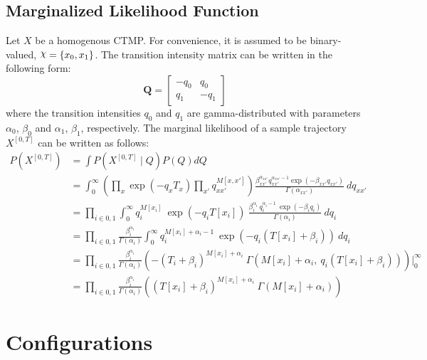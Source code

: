 \subsection{Marginalized Likelihood Function} 
Let $ X $ be a homogenous CTMP. For convenience, it is assumed to be binary-valued, $ \rchi = \left\lbrace x_{0}, x_{1} \right\rbrace $. The transition intensity matrix can be written in the following form:
\begin{equation}
\textbf{Q} = 
\begin{bmatrix}
-q_{0} & q_{0} \\
q_{1} & -q_{1}
\end{bmatrix}
\end{equation}
where the transition intensities $ q_{0} $ and $ q_{1} $ are gamma-distributed with parameters $ \alpha_{0}$, $ \beta_{0} $ and $ \alpha_{1} $, $ \beta_{1} $, respectively. The marginal likelihood of a sample trajectory $ X^{[0,T]} $ can be written as follows:
\begin{align}
P(X^{[0, T]}) & = \int  P(X^{[0, T]}\mid Q)P(Q) dQ \nonumber\\ & = \int_{0}^{\infty} \left( \prod_{x} \exp(-q_{x}T_{x}) \prod_{x'} q_{xx'}^{M[x, x']}\right) \frac{\beta_{xx'}^{\alpha_{xx'}}{q_{xx'}^{\alpha_{xx'}-1}}\exp(-\beta_{xx'}q_{xx'})}{\Gamma(\alpha_{xx'})} \ dq_{xx'} \nonumber\\ & = \prod_{i\in{0,1}}\int_{0}^{\infty} q_{i}^{M[x_{i}]} \ \exp(-q_{i}T[x_{i}]) \  \frac{\beta_{i}^{\alpha_{i}} \ q_{i}^{\alpha_{i}-1}\ \exp(-\beta_{i}q_{i})}{\Gamma(\alpha_{i})} \ dq_{i} \nonumber\\ & = \prod_{i\in{0,1}} \frac{\beta_{i}^{\alpha_{i}}}{\Gamma(\alpha_{i})} \int_{0}^{\infty} q_{i}^{M[x_{i}] + \alpha_{i} -1} \ \exp(-q_{i}(T[x_{i}]+\beta_{i})) \ dq_{i} \\ & = \prod_{i\in{0,1}} \frac{\beta_{i}^{\alpha_{i}}}{\Gamma(\alpha_{i})} \left( -(T_{i}+\beta_{i})^{M[x_{i}] + \alpha_{i}}\ \Gamma(M[x_{i}] + \alpha_{i}, \ q_{i}(T[x_{i}]+\beta_{i})) \right) \Big|_0^\infty  \\ & = \prod_{i\in{0,1}} \frac{\beta_{i}^{\alpha_{i}}}{\Gamma(\alpha_{i})} \left( (T[x_{i}]+\beta_{i})^{M[x_{i}] + \alpha_{i}}\ \Gamma(M[x_{i}] + \alpha_{i}) \right)
\label{eq:Marg_traj}
\end{align}

\section{Configurations}


